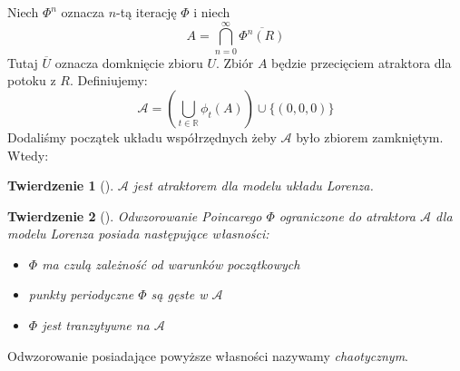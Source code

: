 \documentclass[12pt]{report}
\newtheorem{theorem}{Twierdzenie}
\newcommand{\R}{\mathbb{R}}
\begin{document}
	\par Niech $\Phi^n$ oznacza $n$-tą iterację $\Phi$ i niech
		\[ A = \bigcap\limits^{\infty}_{n=0} \overline{\Phi^n(R)} \]
	Tutaj $\overline{U}$ oznacza domknięcie zbioru $U$. Zbiór $A$ będzie przecięciem atraktora dla potoku z $R$. Definiujemy:
		\[ \mathcal{A} = (\bigcup\limits_{t \in \R} \phi_t(A)) \cup \{(0, 0, 0)\} \]
	Dodaliśmy początek układu współrzędnych żeby $\mathcal{A}$ było zbiorem zamkniętym. Wtedy:
	\begin{theorem}[\cite{HSD}]
		$\mathcal{A}$ jest atraktorem dla modelu układu Lorenza.
	\end{theorem}
	\begin{theorem}[\cite{HSD}]
		Odwzorowanie Poincarego $\Phi$ ograniczone do atraktora $\mathcal{A}$ dla modelu Lorenza posiada następujące własności:
		\begin{itemize}
			\item $\Phi$ ma czulą zależność od warunków początkowych
			\item punkty periodyczne $\Phi$ są gęste w $\mathcal{A}$
			\item $\Phi$ jest tranzytywne na $\mathcal{A}$
		\end{itemize}
	\end{theorem}
	Odwzorowanie posiadające powyższe własności nazywamy \textit{chaotycznym}. \cite{HSD}
\end{document}
